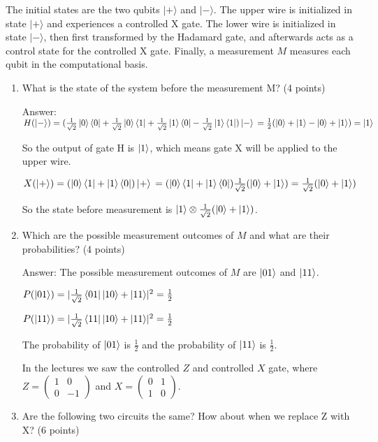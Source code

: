 \documentclass{article}
\begin{document}
The initial states are the two qubits $|+\rangle$ and $|-\rangle$. The upper wire is initialized in state $|+\rangle$ and experiences a controlled X gate. The lower wire is initialized in state $|-\rangle$, then first transformed by the Hadamard gate, and afterwards acts as a control state for the controlled X gate. Finally, a measurement $M$ measures each qubit in the computational basis.
\begin{enumerate}
    \item What is the state of the system before the measurement M? (4 points)

          Answer: $H(\ket{-})=(\frac{1}{\sqrt{2}}\ket{0}\bra{0}+\frac{1}{\sqrt{2}}\ket{0}\bra{1}+\frac{1}{\sqrt{2}}\ket{1}\bra{0}-\frac{1}{\sqrt{2}}\ket{1}\bra{1})\ket{-}
              \\=\frac{1}{2}(\ket{0}+\ket{1}-\ket{0}+\ket{1})
              \\=\ket{1}$

          So the output of gate H is $\ket{1}$, which means gate X will be applied to the upper wire.

          $X(\ket{+})=(\ket{0}\bra{1}+\ket{1}\bra{0})\ket{+}
              \\=(\ket{0}\bra{1}+\ket{1}\bra{0})\frac{1}{\sqrt{2}}(\ket{0}+\ket{1})
              \\=\frac{1}{\sqrt{2}}(\ket{0}+\ket{1})
          $

          So the state before measurement is $\ket{1} \otimes \frac{1}{\sqrt{2}}(\ket{0}+\ket{1})$.


    \item Which are the possible measurement outcomes of $M$ and what are their probabilities? (4 points)

          Answer: The possible measurement outcomes of $M$ are $\ket{01}$ and $\ket{11}$.

          $P(\ket{01})=|\frac{1}{\sqrt{2}}\bra{01}{\ket{10}+\ket{11}}|^2
          =\frac{1}{2}
          $

          $P(\ket{11})=|\frac{1}{\sqrt{2}}\bra{11}{\ket{10}+\ket{11}}|^2
            =\frac{1}{2}
            $

          The probability of $\ket{01}$ is $\frac{1}{2}$ and the probability of $\ket{11}$ is $\frac{1}{2}$.



          In the lectures we saw the controlled $Z$ and controlled $X$ gate, where $Z = \begin{pmatrix} 1 & 0 \\ 0 & -1 \end{pmatrix}$ and $X = \begin{pmatrix} 0 & 1 \\ 1 & 0 \end{pmatrix}$.
    \item Are the following two circuits the same? How about when we replace Z with X? (6 points)



\end{enumerate}
\end{document}
